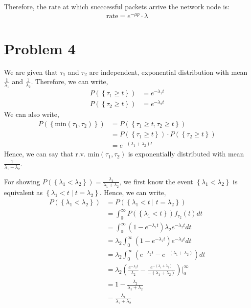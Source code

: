 \documentclass{article}
\begin{document}
		Therefore, the rate at which succcessful packets arrive the network node is:
		\begin{align*}
			\text{rate} = e^{-\mu p} \cdot \lambda
		\end{align*}

	\section*{Problem 4}

		We are given that $\tau_{1}$ and $\tau_{2}$ are independent, exponential
		distribution with mean $\frac{1}{\lambda_{1}}$ and $\frac{1}{\lambda_{2}}$.
		Therefore, we can write,
		\begin{align*}
			P(\left\{ \tau_{1}  \geqslant t \right\}) &= e^{-\lambda_{1} t} \\
			P(\left\{ \tau_{2}  \geqslant t \right\}) &= e^{-\lambda_{2} t}
		\end{align*}
		We can also write,
		\begin{align*}
			P(\left\{ \text{min}(\tau_{1}, \tau_{2}) \right\}) &= P(\left\{ \tau_{1} \geqslant t, \tau_{2} \geqslant t  \right\}) \\
			&= P(\left\{ \tau_{1} \geqslant t \right\}) \cdot P(\left\{ \tau_{2} \geqslant t \right\}) \\
			&= e^{-(\lambda_{1} + \lambda_{2})t}
		\end{align*}
		Hence, we can say that r.v. min$(\tau_{1}, \tau_{2})$ is exponentially
		distributed with mean $\frac{1}{\lambda_{1} + \lambda_{2}}$.

		For showing $P(\left\{ \lambda_{1} < \lambda_{2} \right\}) = \frac{\lambda_{1}}{\lambda_{1} + \lambda_{2}}$,
		we first know the event $\left\{ \lambda_{1} < \lambda_{2} \right\}$ is
		equivalent as $\left\{ \lambda_{1} < t \mid t = \lambda_{2} \right\}$. Hence,
		we can write,
		\begin{align*}
			P(\left\{ \lambda_{1} < \lambda_{2} \right\}) &= P(\left\{ \lambda_{1} < t \mid t = \lambda_{2} \right\}) \\
			&= \int_{0}^{\infty} P(\left\{ \lambda_{1} < t \right\}) f_{\tau_{2}}(t)dt \\
			&= \int_{0}^{\infty} (1 - e^{-\lambda_{1}t}) \lambda_{2}e^{-\lambda_{2}t}dt \\
			&= \lambda_{2} \int_{0}^{\infty} (1 - e^{-\lambda_{1}t}) e^{-\lambda_{2}t}dt \\
			&= \lambda_{2} \int_{0}^{\infty} (e^{-\lambda_{2}t} - e^{-(\lambda_{1} + \lambda_{2})})dt \\
			&= \lambda_{2} (\frac{e^{-\lambda_{2}t}}{\lambda_{2}} - \frac{e^{-(\lambda_{1} + \lambda_{2})}}{-(\lambda_{1} + \lambda_{2})}) \bigg|_{0}^{\infty} \\
			&= 1 - \frac{\lambda_{2}}{\lambda_{1} + \lambda_{2}} \\
			&= \frac{\lambda_{1}}{\lambda_{1} + \lambda_{2}}
		\end{align*} 
\end{document}
